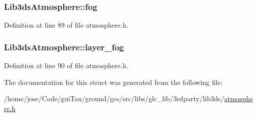 \hypertarget{struct_lib3ds_atmosphere_a5762e9af51d3a3bb910337a760527280}{
\subsubsection[{fog}]{ Lib3ds\-Atmosphere\-::fog}}\label{struct_lib3ds_atmosphere_a5762e9af51d3a3bb910337a760527280}


Definition at line 89 of file atmosphere.\-h.

\hypertarget{struct_lib3ds_atmosphere_a3875fa8e37df9b8a31d72221d8ac59f6}{
\subsubsection[{layer\-\_\-fog}]{ Lib3ds\-Atmosphere\-::layer\-\_\-fog}}\label{struct_lib3ds_atmosphere_a3875fa8e37df9b8a31d72221d8ac59f6}


Definition at line 90 of file atmosphere.\-h.



The documentation for this struct was generated from the following file\-:\begin{DoxyCompactItemize}
\item 
/home/jose/\-Code/gui\-Tau/ground/gcs/src/libs/glc\-\_\-lib/3rdparty/lib3ds/\hyperlink{atmosphere_8h}{atmosphere.\-h}\end{DoxyCompactItemize}
